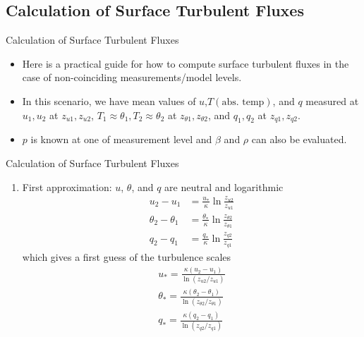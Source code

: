 \subsection{Calculation of Surface Turbulent Fluxes}
\begin{frame}{Calculation of Surface Turbulent Fluxes}
\begin{itemize}
	\item Here is a practical guide for how to compute surface turbulent fluxes in the case of non-coinciding measurements/model levels.
	\item In this scenario, we have mean values of $u$,$T(\text{abs. temp})$, and $q$ measured at $u_1, u_2$ at $z_{u1}, z_{u2}$, $T_1 \approx \theta_1, T_2\approx \theta_2$ at $z_{\theta 1}, z_{\theta 2}$, and $q_1, q_2$ at $z_{q1}, z_{q2}$. 
	\item $p$ is known at one of measurement level and $\beta$ and $\rho$ can also be evaluated.
\end{itemize}
\end{frame}
\begin{frame}{Calculation of Surface Turbulent Fluxes}
\begin{enumerate}
	\item First approximation: $u$, $\theta$, and $q$ are neutral and logarithmic
	\begin{align*}
	u_2 - u_1 &= \frac{u_*}{\kappa} \ln\frac{z_{u2}}{z_{u1}}\\
	\theta_2 - \theta_1 &= \frac{\theta_*}{\kappa} \ln\frac{z_{\theta 2}}{z_{\theta 1}}\\
	q_2 - q_1 &= \frac{q_*}{\kappa} \ln\frac{z_{q2}}{z_{q1}}
	\end{align*}
	which gives a first guess of the turbulence scales
	\begin{align*}
	u_* = \frac{\kappa(u_2 - u_1)}{\ln (z_{u2}/z_{u1})}\\
	\theta_* = \frac{\kappa(\theta_2 - \theta_1)}{\ln (z_{\theta 2}/z_{\theta 1})}\\
	q_* = \frac{\kappa(q_2 - q_1)}{\ln (z_{q2}/z_{q1})}
	\end{align*}
\end{enumerate}
\end{frame}
